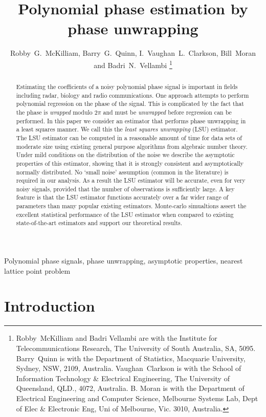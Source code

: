 \documentclass[journal]{IEEEtran}
\title{Polynomial phase estimation by phase unwrapping}
\author{Robby~G.~McKilliam, Barry~G.~Quinn, I.~Vaughan~L.~Clarkson, Bill~Moran and Badri~N.~Vellambi%
    \thanks{%
Robby~McKilliam and Badri Vellambi are with the Institute for Telecommunications Research, The University of South Australia, SA, 5095.  Barry~Quinn is with the Department of Statistics, Macquarie University, Sydney, NSW, 2109, Australia.   Vaughan~Clarkson is with the School of Information Technology \& Electrical Engineering, The University of Queensland, QLD., 4072, Australia.  B. Moran is with the Department of Electrical Engineering and Computer
Science, Melbourne Systems Lab, Dept of Elec \& Electronic Eng, Uni of Melbourne, Vic. 3010, Australia.}}
\begin{document}
 
\maketitle

\begin{abstract}
Estimating the coefficients of a noisy polynomial phase signal is important in fields including radar, biology and radio communications. One approach attempts to perform polynomial regression on the phase of the signal.  This is complicated by the fact that the phase is \emph{wrapped} modulo $2\pi$ and must be \emph{unwrapped} before regression can be performed.  In this paper we consider an estimator that performs phase unwrapping in a least squares manner.  We call this the \emph{least squares unwrapping} (LSU) estimator.  The LSU estimator can be computed in a reasonable amount of time for data sets of moderate size using existing general purpose algorithms from algebraic number theory.  Under mild conditions on the distribution of the noise we describe the asymptotic properties of this estimator, showing that it is strongly consistent and asymptotically normally distributed.  No `small noise' assumption (common in the literature) is required in our analysis.  As a result the LSU estimator will be accurate, even for very noisy signals, provided that the number of observations is sufficiently large.  A key feature is that the LSU estimator functions accurately over a far wider range of parameters than many popular existing estimators.  Monte-carlo simualtions assert the excellent statistical performance of the LSU estimator when compared to existing state-of-the-art estimators and support our theoretical results.
\end{abstract}

\begin{keywords}
Polynomial phase signals, phase unwrapping, asymptotic properties, nearest lattice point problem
\end{keywords}
 
%

\section{Introduction} \label{intro}
\end{document}
